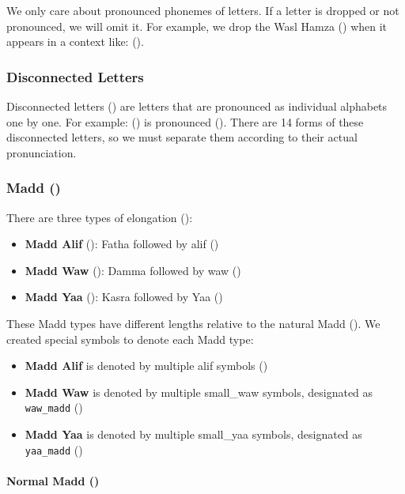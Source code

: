 We only care about pronounced phonemes of letters. If a letter is dropped or not pronounced, we will omit it. For example, we drop the Wasl Hamza () when it appears in a context like: ().

\subsubsection{Disconnected Letters}

Disconnected letters () are letters that are pronounced as individual alphabets one by one. For example: () is pronounced (). There are 14 forms of these disconnected letters, so we must separate them according to their actual pronunciation.

\subsubsection{Madd ()}

There are three types of elongation ():
\begin{itemize}
    \item \textbf{Madd Alif} (): Fatha followed by alif ()
    \item \textbf{Madd Waw} (): Damma followed by waw ()
    \item \textbf{Madd Yaa} (): Kasra followed by Yaa ()
\end{itemize}

These Madd types have different lengths relative to the natural Madd (). We created special symbols to denote each Madd type:

\begin{itemize}
    \item \textbf{Madd Alif} is denoted by multiple alif symbols ()
    \item \textbf{Madd Waw} is denoted by multiple small\_waw symbols, designated as \texttt{waw\_madd} ()
    \item \textbf{Madd Yaa} is denoted by multiple small\_yaa symbols, designated as \texttt{yaa\_madd} ()
\end{itemize}



\paragraph{Normal Madd ()}

